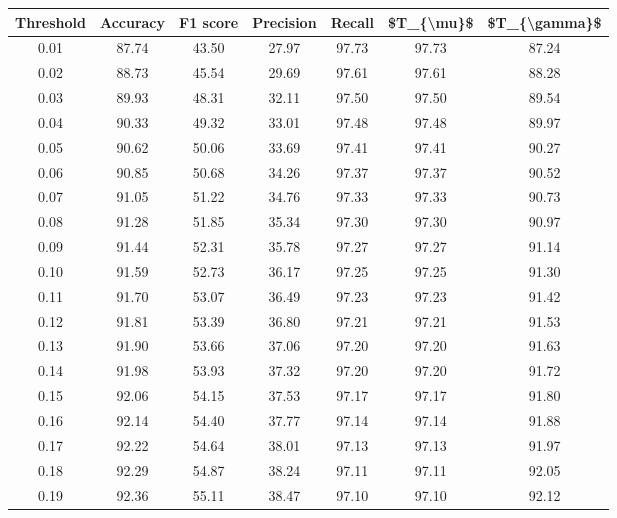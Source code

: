 \begin{tabular}{|c|c|c|c|c|c|c|}
\hline
 Threshold &  Accuracy &  F1 score &  Precision &  Recall &  \$T\_\{\textbackslash mu\}\$ &  \$T\_\{\textbackslash gamma\}\$ \\
\hline
      0.01 &     87.74 &     43.50 &      27.97 &   97.73 &      97.73 &         87.24 \\
      0.02 &     88.73 &     45.54 &      29.69 &   97.61 &      97.61 &         88.28 \\
      0.03 &     89.93 &     48.31 &      32.11 &   97.50 &      97.50 &         89.54 \\
      0.04 &     90.33 &     49.32 &      33.01 &   97.48 &      97.48 &         89.97 \\
      0.05 &     90.62 &     50.06 &      33.69 &   97.41 &      97.41 &         90.27 \\
      0.06 &     90.85 &     50.68 &      34.26 &   97.37 &      97.37 &         90.52 \\
      0.07 &     91.05 &     51.22 &      34.76 &   97.33 &      97.33 &         90.73 \\
      0.08 &     91.28 &     51.85 &      35.34 &   97.30 &      97.30 &         90.97 \\
      0.09 &     91.44 &     52.31 &      35.78 &   97.27 &      97.27 &         91.14 \\
      0.10 &     91.59 &     52.73 &      36.17 &   97.25 &      97.25 &         91.30 \\
      0.11 &     91.70 &     53.07 &      36.49 &   97.23 &      97.23 &         91.42 \\
      0.12 &     91.81 &     53.39 &      36.80 &   97.21 &      97.21 &         91.53 \\
      0.13 &     91.90 &     53.66 &      37.06 &   97.20 &      97.20 &         91.63 \\
      0.14 &     91.98 &     53.93 &      37.32 &   97.20 &      97.20 &         91.72 \\
      0.15 &     92.06 &     54.15 &      37.53 &   97.17 &      97.17 &         91.80 \\
      0.16 &     92.14 &     54.40 &      37.77 &   97.14 &      97.14 &         91.88 \\
      0.17 &     92.22 &     54.64 &      38.01 &   97.13 &      97.13 &         91.97 \\
      0.18 &     92.29 &     54.87 &      38.24 &   97.11 &      97.11 &         92.05 \\
      0.19 &     92.36 &     55.11 &      38.47 &   97.10 &      97.10 &         92.12 \\

\end{tabular}
